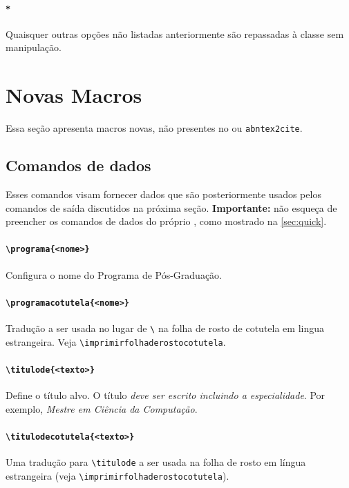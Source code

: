 \documentclass[embeddedlogo]{ufsc-thesis-rn46-2019}
\newcommand{\lacmd}[1]{\texttt{\textbackslash{}#1}}
\begin{document}
\paragraph*{\texttt{*}} Quaisquer outras opções não listadas anteriormente são
repassadas à classe \abnTeX{} sem manipulação.

\section{Novas Macros}

Essa seção apresenta macros novas, não presentes no \abnTeX{} ou
\texttt{abntex2cite}.

\subsection{Comandos de dados}
\label{sec:dados}

Esses comandos visam fornecer dados que são posteriormente usados pelos
comandos de saída discutidos na próxima seção. \textbf{Importante:} não esqueça
de preencher os comandos de dados do próprio \abnTeX, como mostrado na
\autoref{sec:quick}.

\paragraph*{\lacmd{programa\{<nome>\}}} Configura o nome do Programa de
Pós-Graduação.

\paragraph*{\lacmd{programacotutela\{<nome>\}}} Tradução a ser usada no lugar de
\lacmd{\programa} na folha de rosto de cotutela em lingua estrangeira. Veja
\lacmd{imprimirfolhaderostocotutela}.

\paragraph*{\lacmd{titulode\{<texto>\}}} Define o título alvo.  O título
\textit{deve ser escrito incluindo a especialidade}. Por exemplo, \emph{Mestre
  em Ciência da Computação}.

\paragraph*{\lacmd{titulodecotutela\{<texto>\}}} Uma tradução para
\lacmd{titulode} a ser usada na folha de rosto em língua estrangeira (veja
\lacmd{imprimirfolhaderostocotutela}).
\end{document}
